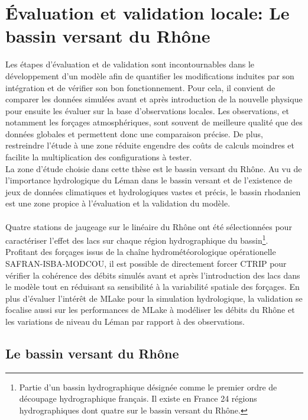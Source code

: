\chapter{{\selectfont \'Evaluation et validation locale: Le bassin versant du Rhône}}
\label{chap:etude-locale}
\minitoc

Les étapes d'évaluation et de validation sont incontournables dans le développement d'un modèle afin de quantifier les modifications induites par son intégration et de vérifier son bon fonctionnement. Pour cela, il convient de comparer les données simulées avant et après introduction de la nouvelle physique pour ensuite les évaluer sur la base d'observations locales. Les observations, et notamment les forçages atmosphériques, sont souvent de meilleure qualité que des données globales et permettent donc une comparaison précise. De plus, restreindre l'étude à une zone réduite engendre des coûts de calculs moindres et facilite la multiplication des configurations à tester. \\
La zone d'étude choisie dans cette thèse est le bassin versant du Rhône. Au vu de l'importance hydrologique du Léman dans le bassin versant et de l'existence de jeux de données climatiques et hydrologiques vastes et précis, le bassin rhodanien est une zone propice à l'évaluation et la validation du modèle.\\
~\\

\noindent Quatre stations de jaugeage sur le linéaire du Rhône ont été sélectionnées pour caractériser l'effet des lacs sur chaque région hydrographique du bassin\footnote{Partie d'un bassin hydrographique désignée comme le premier ordre de découpage hydrographique français. Il existe en France 24 régions hydrographiques dont quatre sur le bassin versant du Rhône.}. Profitant des forçages issus de la chaîne hydrométéorologique opérationelle SAFRAN-ISBA-MODCOU, il est possible de directement forcer CTRIP pour vérifier la cohérence des débits simulés avant et après l'introduction des lacs dans le modèle tout en réduisant sa sensibilité à la variabilité spatiale des forçages. En plus d'évaluer l'intérêt de MLake pour la simulation hydrologique, la validation se focalise aussi sur les performances de MLake à modéliser les débits du Rhône et les variations de niveau du Léman par rapport à des observations.

\section{{\selectfont Le bassin versant du Rhône}}
\label{sec:bv-rhone}

